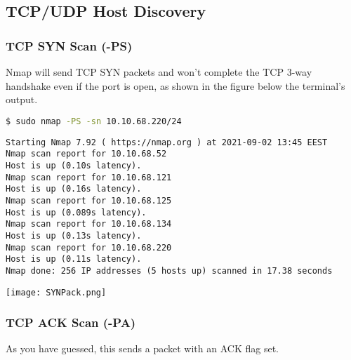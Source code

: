 \documentclass[11pt]{article}
\newenvironment{commandbox}[1][]{
    \begin{tcolorbox}[
        colback=kalibackground,
        colframe=commandcolor,
        fonttitle=\bfseries\color{white},
        title=#1,
        breakable=true
    ]
}{
    \end{tcolorbox}
}
\begin{document}
\setcounter{section}{2}
\setcounter{subsection}{2}
\setcounter{page}{10}  %

\renewcommand{\thesubsubsection}{\thesubsection.\Roman{subsubsection}}

\subsection{TCP/UDP Host Discovery}

\subsubsection{TCP SYN Scan (-PS)}

Nmap will send TCP SYN packets and won't complete the TCP 3-way handshake even if the port is open, as shown in the figure below the terminal's output.

\begin{commandbox}[TCP SYN Scan (-PS)]
\begin{lstlisting}[language=bash, style=bash, basicstyle=\small\ttfamily\color{warningcolor}]
$ sudo nmap -PS -sn 10.10.68.220/24
\end{lstlisting}

\begin{lstlisting}[basicstyle=\small\ttfamily\color{kalitext}]
Starting Nmap 7.92 ( https://nmap.org ) at 2021-09-02 13:45 EEST
Nmap scan report for 10.10.68.52
Host is up (0.10s latency).
Nmap scan report for 10.10.68.121
Host is up (0.16s latency).
Nmap scan report for 10.10.68.125
Host is up (0.089s latency).
Nmap scan report for 10.10.68.134
Host is up (0.13s latency).
Nmap scan report for 10.10.68.220
Host is up (0.11s latency).
Nmap done: 256 IP addresses (5 hosts up) scanned in 17.38 seconds
\end{lstlisting}
\end{commandbox}

\begin{center}
\texttt{[image: SYNPack.png]}
\end{center}

\subsubsection{TCP ACK Scan (-PA)}

As you have guessed, this sends a packet with an ACK flag set.
\end{document}
